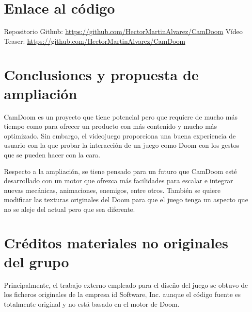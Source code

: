 \documentclass{article}
\begin{document}
\section{Enlace al código}

Repositorio Github: \url{https://github.com/HectorMartinAlvarez/CamDoom}
Vídeo Teaser: \url{https://github.com/HectorMartinAlvarez/CamDoom}

\section{Conclusiones y propuesta de ampliación}

CamDoom es un proyecto que tiene potencial pero que requiere de mucho
más tiempo como para ofrecer un producto con más contenido y mucho más
optimizado. Sin embargo, el videojuego proporciona una buena experiencia
de usuario con la que probar la interacción de un juego como Doom con los
gestos que se pueden hacer con la cara.

Respecto a la ampliación, se tiene pensado para un futuro que CamDoom
esté desarrollado con un motor que ofrezca más facilidades para escalar
e integrar nuevas mecánicas, animaciones, enemigos, entre otros. También
se quiere modificar las texturas originales del Doom para que el juego
tenga un aspecto que no se aleje del actual pero que sea diferente.

\section{Créditos materiales no originales del grupo}

Principalmente, el trabajo externo empleado para el diseño del juego
se obtuvo de los ficheros originales de la empresa id Software, Inc. aunque
el código fuente es totalmente original y no está basado en el motor de Doom.
\end{document}
